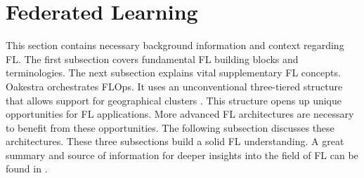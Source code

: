 \section{Federated Learning}\label{section:federated_learning}

This section contains necessary background information and context regarding FL.
The first subsection covers fundamental FL building blocks and terminologies.
The next subsection explains vital supplementary FL concepts.
Oakestra orchestrates FLOps.
It uses an unconventional three-tiered structure that allows support for geographical clusters \cite{paper:oakestra_usenix}.
This structure opens up unique opportunities for FL applications.
More advanced FL architectures are necessary to benefit from these opportunities.
The following subsection discusses these architectures.
These three subsections build a solid FL understanding.
A great summary and source of information for deeper insights into the field of FL can be found in \cite{book:fl}.






